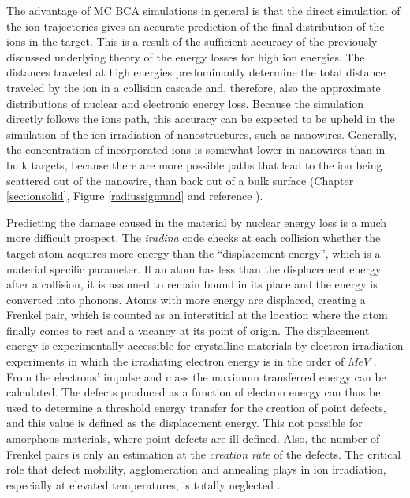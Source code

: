 The advantage of MC BCA simulations in general is that the direct simulation of the ion trajectories gives an accurate prediction of the final distribution of the ions in the target. This is a result of the sufficient accuracy of the previously discussed underlying theory of the energy losses for high ion energies. The distances traveled at high energies predominantly determine the total distance traveled by the ion in a collision cascade and, therefore, also the approximate distributions of nuclear and electronic energy loss. Because the simulation directly follows the ions path, this accuracy can be expected to be upheld in the simulation of the ion irradiation of nanostructures, such as nanowires. Generally, the concentration of incorporated ions is somewhat lower in nanowires than in bulk targets, because there are more possible paths that lead to the ion being scattered out of the nanowire, than back out of a bulk surface (Chapter \ref{sec:ionsolid}, Figure \ref{radiussigmund} and reference \cite{borschel_ion-solid_2012}). 

Predicting the damage caused in the material by nuclear energy loss is a much more difficult prospect. The \emph{iradina} code checks at each collision whether the target atom acquires more energy than the ``displacement energy'', which is a material specific parameter. If an atom has less than the displacement energy after a collision, it is assumed to remain bound in its place and the energy is converted into phonons. Atoms with more energy are displaced, creating a Frenkel pair, which is counted as an interstitial at the location where the atom finally comes to rest and a vacancy at its point of origin. The displacement energy is experimentally accessible for crystalline materials by electron irradiation experiments in which the irradiating electron energy is in the order of $MeV$ \cite{corbett_production_1965}. From the electrons' impulse and mass the maximum transferred energy can be calculated. The defects produced as a function of electron energy can thus be used to determine a threshold energy transfer for the creation of point defects, and this value is defined as the displacement energy. This not possible for amorphous materials, where point defects are ill-defined. Also, the number of Frenkel pairs is only an estimation at the \emph{creation rate} of the defects. The critical role that defect mobility, agglomeration and annealing plays in ion irradiation, especially at elevated temperatures, is totally neglected \cite{pelaz_ion-beam-induced_2004,nordlund_correction_2014}.


